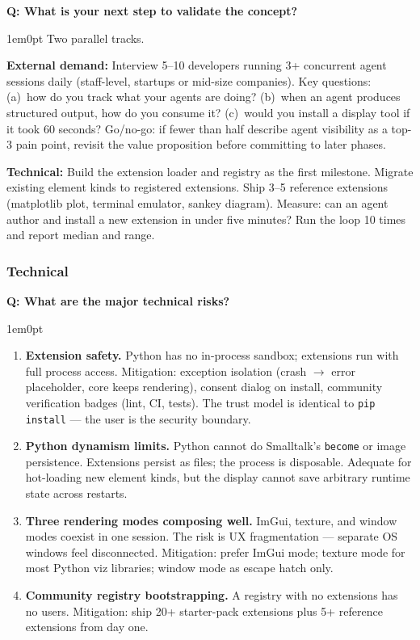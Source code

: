 \documentclass[11pt,letterpaper]{article}
\newcounter{faqnum}
\newenvironment{faqpair}[1]{%
  \needspace{4\baselineskip}%
  \vspace{0.5em}%
  \refstepcounter{faqnum}%
  \noindent\textbf{\color{SectionBlue}Q\thefaqnum: #1}\par\nopagebreak[4]%
  \vspace{0.2em}%
  \begin{adjustwidth}{1em}{0pt}%
  \setlength{\parindent}{0pt}%
}{%
  \end{adjustwidth}%
  \vspace{0.5em}%
}
\begin{document}
\begin{faqpair}{What is your next step to validate the concept?}\label{faq:next-step}
  Two parallel tracks.

  \textbf{External demand:} Interview 5--10 developers running 3+
  concurrent agent sessions daily (staff-level, startups or mid-size
  companies).  Key questions: (a)~how do you track what your agents are
  doing? (b)~when an agent produces structured output, how do you consume
  it? (c)~would you install a display tool if it took 60 seconds?
  Go/no-go: if fewer than half describe agent visibility as a top-3 pain
  point, revisit the value proposition before committing to later phases.

  \textbf{Technical:} Build the extension loader and registry as the first
  milestone.  Migrate existing element kinds to registered extensions.
  Ship 3--5 reference extensions (matplotlib plot, terminal emulator,
  sankey diagram).  Measure: can an agent author and install a new
  extension in under five minutes?  Run the loop 10 times and report
  median and range.
\end{faqpair}

\subsubsection*{Technical}

\begin{faqpair}{What are the major technical risks?}\label{faq:tech-risks}
  \begin{enumerate}[nosep]
    \item \textbf{Extension safety.}  Python has no in-process sandbox;
      extensions run with full process access.  Mitigation: exception
      isolation (crash $\to$ error placeholder, core keeps rendering),
      consent dialog on install, community verification badges (lint, CI,
      tests).  The trust model is identical to \texttt{pip install} ---
      the user is the security boundary.
    \item \textbf{Python dynamism limits.}  Python cannot do Smalltalk's
      \texttt{become} or image persistence.  Extensions persist as files;
      the process is disposable.  Adequate for hot-loading new element
      kinds, but the display cannot save arbitrary runtime state across
      restarts.
    \item \textbf{Three rendering modes composing well.}  ImGui, texture,
      and window modes coexist in one session.  The risk is UX
      fragmentation --- separate OS windows feel disconnected.  Mitigation:
      prefer ImGui mode; texture mode for most Python viz libraries;
      window mode as escape hatch only.
    \item \textbf{Community registry bootstrapping.}  A registry with no
      extensions has no users.  Mitigation: ship 20+ starter-pack
      extensions plus 5+ reference extensions from day one.
  \end{enumerate}
\end{faqpair}
\end{document}
